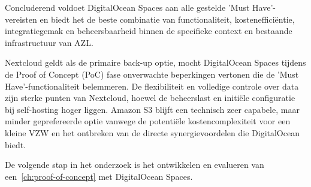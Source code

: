 Concluderend voldoet DigitalOcean Spaces aan alle gestelde 'Must Have'-vereisten en biedt het de beste combinatie van functionaliteit, kostenefficiëntie, integratiegemak en beheersbaarheid binnen de specifieke context en bestaande infrastructuur van AZL.

Nextcloud geldt als de primaire back-up optie, mocht DigitalOcean Spaces tijdens de Proof of Concept (PoC) fase onverwachte beperkingen vertonen die de 'Must Have'-functionaliteit belemmeren. De flexibiliteit en volledige controle over data zijn sterke punten van Nextcloud, hoewel de beheerslast en initiële configuratie bij self-hosting hoger liggen. Amazon S3 blijft een technisch zeer capabele, maar minder geprefereerde optie vanwege de potentiële kostencomplexiteit voor een kleine VZW en het ontbreken van de directe synergievoordelen die DigitalOcean biedt.

De volgende stap in het onderzoek is het ontwikkelen en evalueren van een~\ref{ch:proof-of-concept} met DigitalOcean Spaces.